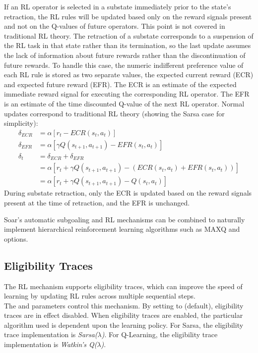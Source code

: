 If an RL operator is selected in a substate immediately prior to the state's retraction, the RL rules will be updated based only on the reward signals present and not on the Q-values of future operators.
This point is not covered in traditional RL theory.
The retraction of a substate corresponds to a suspension of the RL task in that state rather than its termination, so the last update assumes the lack of information about future rewards rather than the discontinuation of future rewards.
To handle this case, the numeric indifferent preference value of each RL rule is stored as two separate values, the expected current reward (ECR) and expected future reward (EFR).
The ECR is an estimate of the expected immediate reward signal for executing the corresponding RL operator.
The EFR is an estimate of the time discounted Q-value of the next RL operator.
Normal updates correspond to traditional RL theory (showing the Sarsa case for simplicity):
\begin{align*}
\delta_{ECR} &= \alpha \left[ r_t - ECR(s_t, a_t) \right] \\
\delta_{EFR} &= \alpha \left[ \gamma Q(s_{t+1}, a_{t+1}) - EFR(s_t, a_t) \right] \\
\delta_t &= \delta_{ECR} + \delta_{EFR} \\
&= \alpha \left[ r_t + \gamma Q(s_{t+1}, a_{t+1}) - \left( ECR(s_t, a_t) + EFR(s_t, a_t) \right) \right] \\
&= \alpha \left[ r_t + \gamma Q(s_{t+1}, a_{t+1}) - Q(s_t, a_t) \right]
\end{align*}
During substate retraction, only the ECR is updated based on the reward signals present at the time of retraction, and the EFR is unchanged.

Soar's automatic subgoaling and RL mechanisms can be combined to naturally implement hierarchical reinforcement learning algorithms such as MAXQ and options.

\subsection{Eligibility Traces}
\label{RL-et}
The RL mechanism supports eligibility traces, which can improve the speed of learning by 
updating RL rules across multiple sequential steps. \\
The  and  parameters control this mechanism.
By setting  to  (default), eligibility traces are in effect disabled.
When eligibility traces are enabled, the particular algorithm used is dependent upon the learning policy.
For Sarsa, the eligibility trace implementation is \emph{Sarsa($\lambda$)}. 
For Q-Learning, the eligibility trace implementation is \emph{Watkin's Q($\lambda$)}.


